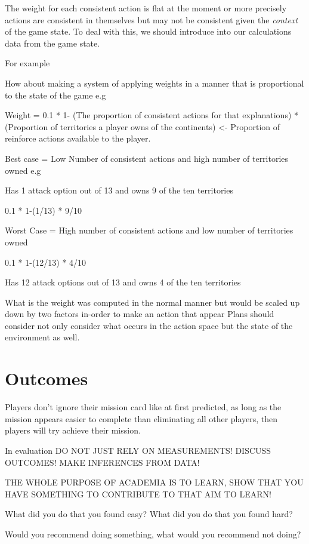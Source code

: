 \documentclass[parskip]{cs4rep}
\begin{document}
The weight for each consistent action is flat at the moment or more precisely actions are consistent in themselves but may not be consistent given the \textit{context} of the game state. To deal with this, we should introduce into our calculations data from the game state.

For example

How about making a system of applying weights in a manner that is proportional to the state of the game e.g

Weight = 0.1 * 1- (The proportion of consistent actions for that explanations) * (Proportion of territories a player owns of the continents) <- Proportion of reinforce actions available to the player.

Best case = Low Number of consistent actions and high number of territories owned e.g

Has 1 attack option out of 13 and owns 9 of the ten territories

0.1 * 1-(1/13) * 9/10 

Worst Case = High number of consistent actions and low number of territories owned

0.1 * 1-(12/13) * 4/10 

Has 12 attack options out of 13 and owns 4 of the ten territories

What is the weight was computed in the normal manner but would be scaled up down by two factors in-order to make an action that appear
Plans should consider not only consider what occurs in the action space but the state of the environment as well.

\section{Outcomes}

Players don't ignore their mission card like at first predicted, as long as the mission appears easier to complete than eliminating all other players, then players will try achieve their mission.

In evaluation DO NOT JUST RELY ON MEASUREMENTS! DISCUSS OUTCOMES! MAKE INFERENCES FROM DATA!

THE WHOLE PURPOSE OF ACADEMIA IS TO LEARN, SHOW THAT YOU HAVE SOMETHING TO CONTRIBUTE TO THAT AIM TO LEARN!

What did you do that you found easy? What did you do that you found hard? 

Would you recommend doing something, what would you recommend not doing?
\end{document}
